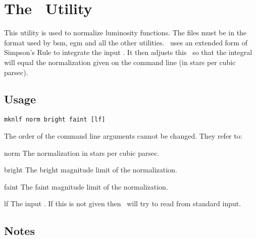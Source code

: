 \documentclass[11pt,twoside]{article}
\begin{document}

\newpage
\section{The \mknlf\ Utility}

This utility is used to normalize luminosity functions. The files must be in 
the format used by {\sc bsm}, {\sc egm} and all the other utilities. 
\mknlf\ uses an extended form of Simpson's Rule to integrate the input \lf. 
It then adjusts this \lf\ so that the integral will equal the normalization 
given on the command line (in stars per cubic parsec).

\subsection*{Usage}

\begin{verbatim}
mknlf norm bright faint [lf]
\end{verbatim}

\nin
The order of the command line arguments cannot be changed. They refer to:
\medskip

\begin{clo}{norm}
The normalization in stars per cubic parsec.
\end{clo}

\begin{clo}{bright}
The bright magnitude limit of the normalization. 
\end{clo}

\begin{clo}{faint}
The faint magnitude limit of the normalization. 
\end{clo}

\begin{clo}{lf}
The input \lf. If this is not given then \mknlf\ will try to read from
standard input.
\end{clo}

\subsection*{Notes}
\end{document}
